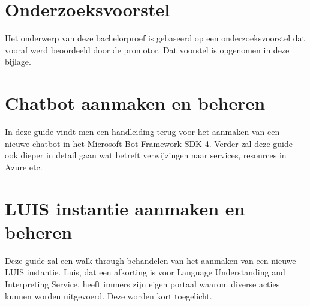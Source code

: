 \documentclass{bachproef-tin}
\begin{document}
    
    
    
    
    
    \appendix
    \renewcommand{\chaptername}{Appendix}
    
    
    \chapter{Onderzoeksvoorstel}
    
    Het onderwerp van deze bachelorproef is gebaseerd op een onderzoeksvoorstel dat vooraf werd beoordeeld door de promotor. Dat voorstel is opgenomen in deze bijlage.
    
    
    
    \chapter{Chatbot aanmaken en beheren}
    In deze guide vindt men een handleiding terug voor het aanmaken van een nieuwe chatbot in het Microsoft Bot Framework SDK 4. Verder zal deze guide ook dieper in detail gaan wat betreft verwijzingen naar services, resources in Azure etc. 
    
    
    \chapter{LUIS instantie aanmaken en beheren}
    Deze guide zal een walk-through behandelen van het aanmaken van een nieuwe LUIS instantie. Luis, dat een afkorting is voor Language Understanding and Interpreting Service, heeft immers zijn eigen portaal waarom diverse acties kunnen worden uitgevoerd. Deze worden kort toegelicht. 
    
    
\end{document}
